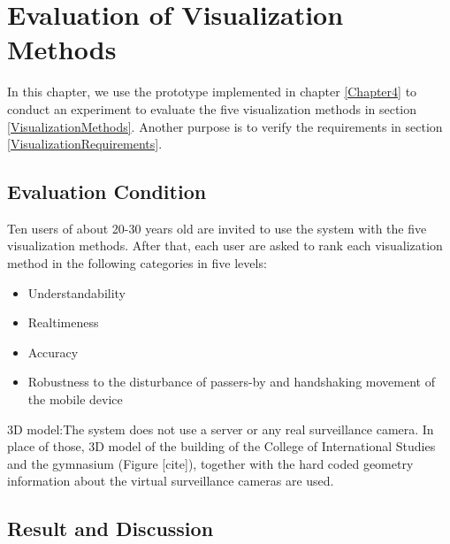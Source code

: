 \chapter{Evaluation of Visualization Methods}
\label{Chapter5}

In this chapter, we use the prototype implemented in chapter \ref{Chapter4} to conduct an experiment to evaluate the five visualization methods in section \ref{VisualizationMethods}. Another purpose is to verify the requirements in section \ref{VisualizationRequirements}.


\section{Evaluation Condition}

Ten users of about 20-30 years old are invited to use the system with the five visualization methods. After that, each user are asked to rank each visualization method in the following categories in five levels:

\begin{itemize}
	\item Understandability
	\item Realtimeness
	\item Accuracy
	\item Robustness to the disturbance of passers-by and handshaking movement of the mobile device
\end{itemize}

3D model:The system does not use a server or any real surveillance camera. In place of those, 3D model of the building of the College of International Studies and the gymnasium (Figure [cite]), together with the hard coded geometry information about the virtual surveillance cameras are used.


\section{Result and Discussion}

